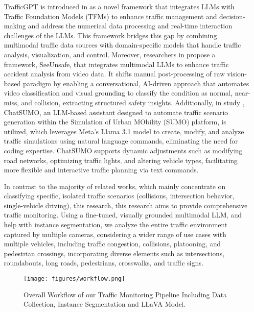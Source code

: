 TrafficGPT is introduced in \cite{14} as a novel framework that integrates LLMs with Traffic Foundation Models (TFMs) to enhance traffic management and decision-making and address the numerical data processing and real-time interaction challenges of the LLMs. This framework bridges this gap by combining multimodal traffic data sources with domain-specific models that handle traffic analysis, visualization, and control. Moreover, researchers in \cite{15} propose a framework, SeeUnsafe, that integrates multimodal LLMs to enhance traffic accident analysis from video data. It shifts manual post-processing of raw vision-based paradigm by enabling a conversational, AI-driven approach that automates video classification and visual grounding to classify the condition as normal, near-miss, and collision, extracting structured safety insights. Additionally, in study \cite{16}, ChatSUMO, an LLM-based assistant designed to automate traffic scenario generation within the Simulation of Urban MObility (SUMO) platform, is utilized, which leverages Meta's Llama 3.1 model to create, modify, and analyze traffic simulations using natural language commands, eliminating the need for coding expertise. ChatSUMO supports dynamic adjustments such as modifying road networks, optimizing traffic lights, and altering vehicle types, facilitating more flexible and interactive traffic planning via text commands. 

In contrast to the majority of related works, which mainly concentrate on classifying specific, isolated traffic scenarios (collisions, intersection behavior, single-vehicle driving), this research, this research aims to provide comprehensive traffic monitoring. Using a fine-tuned, visually grounded multimodal LLM, and help with instance segmentation, we analyze the entire traffic environment captured by multiple cameras, considering a wider range of use cases with multiple vehicles, including traffic congestion, collisions, platooning, and pedestrian crossings, incorporating diverse elements such as intersections, roundabouts, long roads, pedestrians, crosswalks, and traffic signs.

\begin{figure*} [t]
    \centering
    \texttt{[image: figures/workflow.png]}
    \caption{Overall Workflow of our Traffic Monitoring Pipeline Including Data Collection, Instance Segmentation and LLaVA Model.}
    \label{fig: workflow}
\end{figure*}